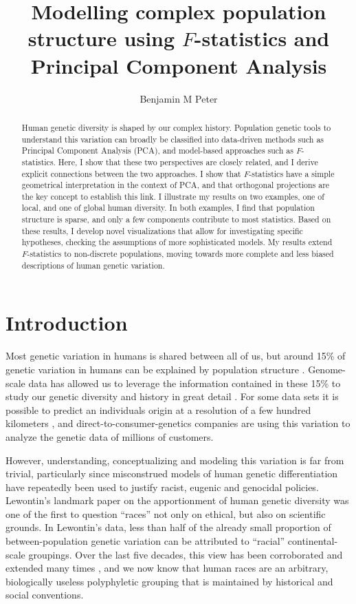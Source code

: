\documentclass[12pt,fullpage, a4paper]{article}
\title{Modelling complex population structure using $F$-statistics and Principal Component Analysis}
\author{Benjamin M Peter}
\begin{document}
	\maketitle
\begin{abstract}
Human  genetic diversity is shaped by our complex history. Population genetic tools to understand this variation can broadly be classified into data-driven methods such as Principal Component Analysis (PCA), and model-based approaches such as $F$-statistics.
Here, I show that these two perspectives are closely related, and I derive explicit connections between the two approaches. I show that $F$-statistics have a simple geometrical interpretation in the context of PCA, and that orthogonal projections are the key concept to establish this link. I illustrate my results on two examples, one of local, and one of global human diversity. In both examples, I find that population structure is sparse, and only a few components contribute to most statistics. Based on these results, I develop novel visualizations that allow for investigating specific hypotheses, checking the assumptions of more sophisticated models. My results extend $F$-statistics to non-discrete populations, moving towards more complete and less biased descriptions of human genetic variation.
\end{abstract}
\section{Introduction}
Most genetic variation in humans is shared between all of us, but around 15\% of genetic variation in humans can be explained by population structure \citep{dobzhansky1972, barbujani1997, rosenberg2002a}. Genome-scale data has allowed us to leverage the information contained in these 15\% to study our genetic diversity and history in great detail \citep{cavalli-sforza1994,reich2018a}. For some data sets it is possible to predict an individuals origin at a resolution of a few hundred kilometers \citep{novembre2008, leslie2015}, and direct-to-consumer-genetics companies are using this variation to analyze the genetic data of millions of customers.

However, understanding, conceptualizing and modeling this variation is far from trivial, particularly since misconstrued models of human genetic differentiation have repeatedly been used to justify racist, eugenic and genocidal policies. Lewontin's landmark \citeyear{dobzhansky1972} paper on the apportionment of human genetic diversity was one of the first to question ``races'' not only on ethical, but also on scientific grounds. In Lewontin's data, less than half of the already small proportion of between-population genetic variation can be attributed to ``racial'' continental-scale groupings. Over the last five decades, this view has been corroborated and extended many times \citep{cann1987, cavalli-sforza1994, cann2002, rosenberg2002, reich2018a}, and we now know that human races are an arbitrary, biologically useless polyphyletic grouping that is maintained by historical and social conventions.
\end{document}
